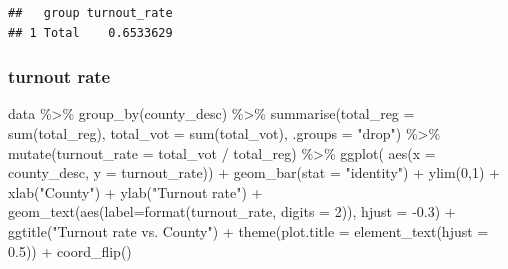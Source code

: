 \documentclass[
]{article}
\newenvironment{Shaded}{\begin{snugshade}}{\end{snugshade}}
\newcommand{\AttributeTok}[1]{\textcolor[rgb]{0.77,0.63,0.00}{#1}}
\newcommand{\DecValTok}[1]{\textcolor[rgb]{0.00,0.00,0.81}{#1}}
\newcommand{\FloatTok}[1]{\textcolor[rgb]{0.00,0.00,0.81}{#1}}
\newcommand{\FunctionTok}[1]{\textcolor[rgb]{0.00,0.00,0.00}{#1}}
\newcommand{\NormalTok}[1]{#1}
\newcommand{\SpecialCharTok}[1]{\textcolor[rgb]{0.00,0.00,0.00}{#1}}
\newcommand{\StringTok}[1]{\textcolor[rgb]{0.31,0.60,0.02}{#1}}
\begin{document}
\begin{verbatim}
##   group turnout_rate
## 1 Total    0.6533629
\end{verbatim}

\hypertarget{turnout-rate}{%
\subsubsection{turnout rate}\label{turnout-rate}}

\begin{Shaded}
\begin{Highlighting}[]
\NormalTok{data }\SpecialCharTok{\%\textgreater{}\%}
  \FunctionTok{group\_by}\NormalTok{(county\_desc) }\SpecialCharTok{\%\textgreater{}\%}
  \FunctionTok{summarise}\NormalTok{(}\AttributeTok{total\_reg =} \FunctionTok{sum}\NormalTok{(total\_reg),}
            \AttributeTok{total\_vot =} \FunctionTok{sum}\NormalTok{(total\_vot), }\AttributeTok{.groups =} \StringTok{"drop"}\NormalTok{) }\SpecialCharTok{\%\textgreater{}\%}
  \FunctionTok{mutate}\NormalTok{(}\AttributeTok{turnout\_rate =}\NormalTok{ total\_vot }\SpecialCharTok{/}\NormalTok{ total\_reg) }\SpecialCharTok{\%\textgreater{}\%}
  \FunctionTok{ggplot}\NormalTok{( }\FunctionTok{aes}\NormalTok{(}\AttributeTok{x =}\NormalTok{ county\_desc, }\AttributeTok{y =}\NormalTok{ turnout\_rate)) }\SpecialCharTok{+}
    \FunctionTok{geom\_bar}\NormalTok{(}\AttributeTok{stat =} \StringTok{"identity"}\NormalTok{) }\SpecialCharTok{+}
    \FunctionTok{ylim}\NormalTok{(}\DecValTok{0}\NormalTok{,}\DecValTok{1}\NormalTok{) }\SpecialCharTok{+}
    \FunctionTok{xlab}\NormalTok{(}\StringTok{"County"}\NormalTok{) }\SpecialCharTok{+} \FunctionTok{ylab}\NormalTok{(}\StringTok{"Turnout rate"}\NormalTok{) }\SpecialCharTok{+}
    \FunctionTok{geom\_text}\NormalTok{(}\FunctionTok{aes}\NormalTok{(}\AttributeTok{label=}\FunctionTok{format}\NormalTok{(turnout\_rate, }\AttributeTok{digits =} \DecValTok{2}\NormalTok{)), }\AttributeTok{hjust =} \SpecialCharTok{{-}}\FloatTok{0.3}\NormalTok{) }\SpecialCharTok{+}
    \FunctionTok{ggtitle}\NormalTok{(}\StringTok{"Turnout rate vs. County"}\NormalTok{) }\SpecialCharTok{+}
      \FunctionTok{theme}\NormalTok{(}\AttributeTok{plot.title =} \FunctionTok{element\_text}\NormalTok{(}\AttributeTok{hjust =} \FloatTok{0.5}\NormalTok{)) }\SpecialCharTok{+}
    \FunctionTok{coord\_flip}\NormalTok{()}
\end{Highlighting}
\end{Shaded}
\end{document}
